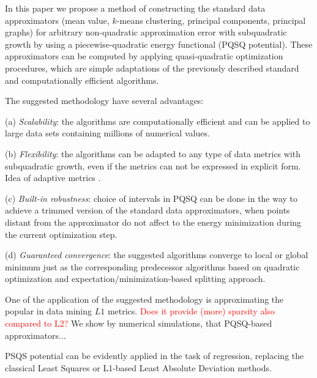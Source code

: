 \documentclass[preprint,12pt]{elsarticle}
\newcommand\myworries[1]{\textcolor{red}{#1}}
\begin{document}
In this paper we propose a method of constructing the standard data approximators (mean value, $k$-means clustering, principal components, principal graphs)
for arbitrary non-quadratic approximation error with subquadratic growth by using a piecewise-quadratic energy functional (PQSQ potential). These approximators can be computed
by applying quasi-quadratic optimization procedures, which are simple adaptations of the previously described standard and computationally efficient algorithms.

The suggested methodology have several advantages:

(a) \textit{Scalability}: the algorithms are computationally efficient and can be applied to large data sets containing millions of numerical values.

(b) \textit{Flexibility}: the algorithms can be adapted to any type of data metrics with subquadratic growth, even if the metrics can not be expressed in explicit form. Idea of adaptive metrics \cite{Yang2006, Wu2009}.

(c) \textit{Built-in robustness}: choice of intervals in PQSQ can be done in the way to achieve a trimmed version of the standard data approximators, when points distant from the approximator do not affect to the energy minimization during the current optimization step.

(d) \textit{Guaranteed convergence}: the suggested algorithms converge to local or global minimum just as the corresponding predecessor algorithms based on quadratic optimization and expectation/minimization-based splitting approach.

One of the application of the suggested methodology is approximating the popular in data mining $L1$ metrics. \myworries{ Does it provide (more) sparsity also compared to L2?} We show by numerical simulations, that PQSQ-based approximators...

PSQS potential can be evidently applied in the task of regression, replacing the classical Least Squares or L1-based Least Absolute Deviation methods.









\end{document}
